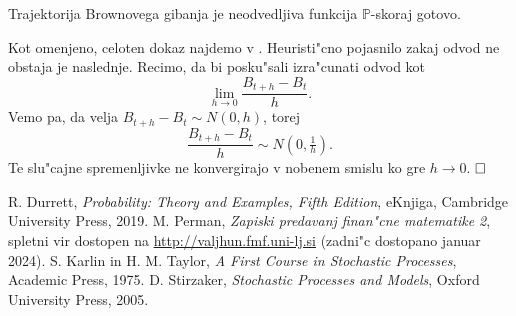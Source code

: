 \documentclass[twoside,11pt]{article}
\begin{document}
\begin{izrek}
    Trajektorija Brownovega gibanja je neodvedljiva funkcija $\mathbb{P}$-skoraj gotovo.
\end{izrek}

\begin{dokaz}
    Kot omenjeno, celoten dokaz najdemo v \cite{1}. Heuristi"cno pojasnilo zakaj odvod ne obstaja je naslednje. Recimo, da bi posku"sali izra"cunati odvod kot
    $$
        \lim_{h\to0}\frac{B_{t+h} - B_t}{h}.
    $$
    Vemo pa, da velja $B_{t+h} - B_t \sim N(0, h)$, torej
    $$
        \frac{B_{t+h} - B_t}{h} \sim N(0, \tfrac{1}{h}).
    $$
    Te slu"cajne spremenljivke ne konvergirajo v nobenem smislu ko gre $h \rightarrow 0$. 
    $\hfill \square$
\end{dokaz}

\begin{thebibliography}{99}

 R. Durrett, \emph{Probability: Theory and Examples, Fifth Edition}, eKnjiga, Cambridge University Press, 2019. 
 M. Perman, \emph{Zapiski predavanj finan"cne matematike 2}, spletni vir dostopen na \href{http://valjhun.fmf.uni-lj.si}{http://valjhun.fmf.uni-lj.si} (zadni"c dostopano januar 2024).
 S. Karlin in H. M. Taylor, \emph{A First Course in Stochastic Processes}, Academic Press, 1975.
 D. Stirzaker, \emph{Stochastic Processes and Models}, Oxford University Press, 2005.


\end{thebibliography}
\end{document}
